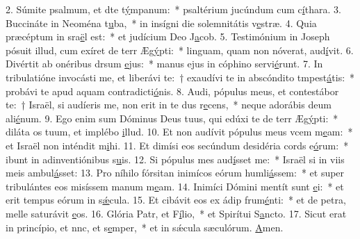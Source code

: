 2. Súmite psalmum, et dte t\uline{ý}mpanum:~* psaltérium jucúndum cum c\uline{í}thara.
3. Buccináte in Neoména t\uline{u}ba,~* in insígni die solemnitátis v\uline{e}stræ.
4. Quia præcéptum in sra\uline{ë}l est:~* et judícium Deo J\uline{a}cob.
5. Testimónium in Joseph pósuit illud, cum exíret de terr Æg\uline{ý}pti:~* linguam, quam non nóverat, aud\uline{í}vit.
6. Divértit ab onéribus drsum \uline{e}jus:~* manus ejus in cóphino servi\uline{é}runt.
7. In tribulatióne invocásti me, et liberávi te:~† exaudívi te in abscóndito tmpest\uline{á}tis:~* probávi te apud aquam contradicti\uline{ó}nis.
8. Audi, pópulus meus, et contestábor te:~† Israël, si audíeris me, non erit in te dus r\uline{e}cens,~* neque adorábis deum ali\uline{é}num.
9. Ego enim sum Dóminus Deus tuus, qui edúxi te de terr Æg\uline{ý}pti:~* diláta os tuum, et implébo \uline{i}llud.
10. Et non audívit pópulus meus vcem m\uline{e}am:~* et Israël non inténdit m\uline{i}hi.
11. Et dimísi eos secúndum desidéria cords e\uline{ó}rum:~* ibunt in adinventiónibus s\uline{u}is.
12. Si pópulus mes aud\uline{í}sset me:~* Israël si in viis meis ambul\uline{á}sset:
13. Pro níhilo fórsitan inimícos eórum humli\uline{á}ssem:~* et super tribulántes eos misíssem manum m\uline{e}am.
14. Inimíci Dómini mentít sunt \uline{e}i:~* et erit tempus eórum in s\uline{ǽ}cula.
15. Et cibávit eos ex ádip frum\uline{é}nti:~* et de petra, melle saturávit \uline{e}os.
16. Glória Patr, et F\uline{í}lio,~* et Spirítui S\uline{a}ncto.
17. Sicut erat in princípio, et nnc, et s\uline{e}mper,~* et in sǽcula sæculórum. \uline{A}men.
